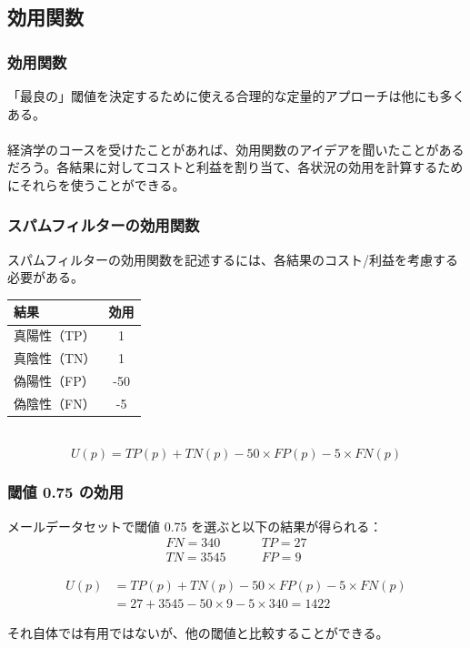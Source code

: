 
\subsection{効用関数}


\begin{frame}
\frametitle{効用関数}

「最良の」閾値を決定するために使える合理的な定量的アプローチは他にも多くある。\\
~\\
経済学のコースを受けたことがあれば、効用関数のアイデアを聞いたことがあるだろう。各結果に対してコストと利益を割り当て、各状況の効用を計算するためにそれらを使うことができる。

\end{frame}


\begin{frame}
\frametitle{スパムフィルターの効用関数}

スパムフィルターの効用関数を記述するには、各結果のコスト/利益を考慮する必要がある。

\begin{center}
 \renewcommand\arraystretch{1.5}
\begin{tabular}{l|c}
結果 & 効用 \\
\hline
真陽性（TP）  & 1 \\
真陰性（TN）  & 1 \\
偽陽性（FP） & -50 \\
偽陰性（FN） & -5 \\
\end{tabular}
\end{center}
~\\
\[U(p) = TP(p) + TN(p) - 50 \times FP(p) - 5 \times FN(p)\]

\end{frame}


\begin{frame}
\frametitle{閾値 0.75 の効用}

メールデータセットで閾値 0.75 を選ぶと以下の結果が得られる：
\vspace{-1.5mm}
\begin{align*}
FN = 340 &\qquad TP = 27 \\
TN = 3545 &\qquad FP = 9
\end{align*}

\begin{align*}
U(p) &= TP(p) + TN(p) - 50 \times FP(p) - 5 \times FN(p) \\
     &= 27+3545-50\times9-5\times340 = 1422
\end{align*}

それ自体では有用ではないが、他の閾値と比較することができる。

\end{frame}

